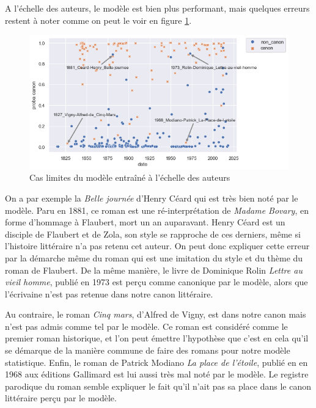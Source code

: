 A l'échelle des auteurs, le modèle est bien plus performant, mais quelques erreurs restent à noter comme on peut le voir en figure \ref{outlier_author}. 
\begin{figure}[!ht]
    \centering
    \includegraphics[width=15cm]{img/11_outliers_fabula_results.png}
    \caption{Cas limites du modèle entraîné à l'échelle des auteurs}
    \label{outlier_author}
\end{figure}

On a par exemple la \textit{Belle journée} d'Henry Céard qui est très bien noté par le modèle. Paru en 1881, ce roman est une ré-interprétation de \textit{Madame Bovary}, en forme d'hommage à Flaubert, mort un an auparavant. Henry Céard est un disciple de Flaubert et de Zola, son style se rapproche de ces derniers, même si l'histoire littéraire n'a pas retenu cet auteur. On peut donc expliquer cette erreur par la démarche même du roman qui est une imitation du style et du thème du roman de Flaubert. De la même manière, le livre de Dominique Rolin \textit{Lettre au vieil homme}, publié en 1973 est perçu comme canonique par le modèle, alors que l'écrivaine n'est pas retenue dans notre canon littéraire.

Au contraire, le roman \textit{Cinq mars}, d'Alfred de Vigny, est dans notre canon mais n'est pas admis comme tel par le modèle. Ce roman est considéré comme le premier roman historique, et l'on peut émettre l'hypothèse que c'est en cela qu'il se démarque de la manière commune de faire des romans pour notre modèle statistique. Enfin, le roman de Patrick Modiano \textit{La place de l'étoile}, publié en en 1968 aux éditions Gallimard est lui aussi très mal noté par le modèle. Le registre parodique du roman semble expliquer le fait qu'il n'ait pas sa place dans le canon littéraire perçu par le modèle.



